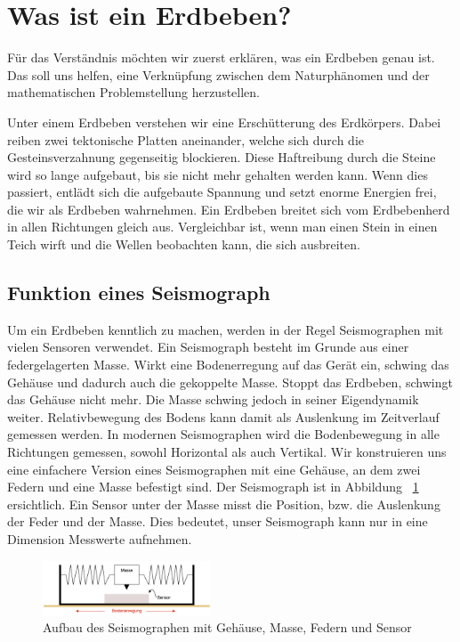 %
%
\section{Was ist ein Erdbeben? \label{erdbeben:section:teil0}}
Für das Verständnis möchten wir zuerst erklären, was ein Erdbeben genau ist.
Das soll uns helfen, eine Verknüpfung zwischen dem Naturphänomen und der mathematischen Problemstellung herzustellen.

Unter einem Erdbeben verstehen wir eine Erschütterung des Erdkörpers.
Dabei reiben zwei tektonische Platten aneinander, welche sich durch die Gesteinsverzahnung gegenseitig blockieren.
Diese Haftreibung durch die Steine wird so lange aufgebaut, bis sie nicht mehr gehalten werden kann.
Wenn dies passiert, entlädt sich die aufgebaute Spannung und setzt enorme Energien frei, die wir als Erdbeben wahrnehmen.
Ein Erdbeben breitet sich vom Erdbebenherd in allen Richtungen gleich aus.
Vergleichbar ist, wenn man einen Stein in einen Teich wirft und die Wellen beobachten kann, die sich ausbreiten.

\subsection{Funktion eines Seismograph}
Um ein Erdbeben kenntlich zu machen, werden in der Regel Seismographen mit vielen Sensoren verwendet. 
Ein Seismograph besteht im Grunde aus einer federgelagerten Masse. Wirkt eine Bodenerregung auf das Gerät ein, schwing das Gehäuse und dadurch auch die gekoppelte Masse. 
Stoppt das Erdbeben, schwingt das Gehäuse nicht mehr. 
Die Masse schwing jedoch in seiner Eigendynamik weiter. 
Relativbewegung des Bodens kann damit als Auslenkung im Zeitverlauf gemessen werden.
In modernen Seismographen wird die Bodenbewegung in alle Richtungen gemessen, sowohl Horizontal als auch Vertikal. 
Wir konstruieren uns eine einfachere Version eines Seismographen mit eine Gehäuse, an dem zwei Federn und eine Masse befestigt sind. 
Der Seismograph ist in Abbildung ~\ref{erdbeben:Seismograph} ersichtlich.
Ein Sensor unter der Masse misst die Position, bzw. die Auslenkung der Feder und der Masse.
Dies bedeutet, unser Seismograph kann nur in eine Dimension Messwerte aufnehmen. 

\begin{figure}
 \begin{center}
 \includegraphics[width=5cm]{papers/erdbeben/Apperatur}
 \caption{Aufbau des Seismographen mit Gehäuse, Masse, Federn und Sensor}
 \label{erdbeben:Seismograph}
 \end{center}
\end{figure}

